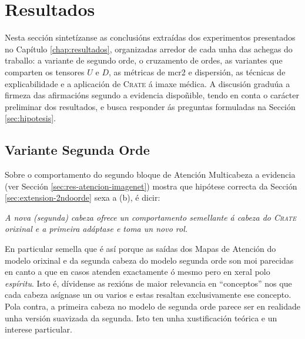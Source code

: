 \section{Resultados}

Nesta sección sintetízanse as conclusións extraídas dos experimentos presentados no Capítulo \ref{chap:resultados}, organizadas arredor de cada unha das achegas do traballo: a variante de segundo orde, o cruzamento de ordes, as variantes que comparten os tensores $U$ e $D$, as métricas de \acrshort{mcr2} e dispersión, as técnicas de explicabilidade e a aplicación de \textsc{Crate} á imaxe médica. A discusión graduúa a firmeza das afirmacións segundo a evidencia dispoñible, tendo en conta o carácter preliminar dos resultados, e busca responder ás preguntas formuladas na Sección \ref{sec:hipotesis}.


\subsection{Variante Segunda Orde}
\label{sec:con-at2nd}

Sobre o comportamento do segundo bloque de Atención Multicabeza a evidencia (ver Sección \ref{sec:res-atencion-imagenet}) mostra que hipótese correcta da Sección \ref{sec:extension-2ndoorde} sexa a (b), é dicir:

\begin{center}\begin{minipage}{0.8\textwidth}\centering \emph{A nova (segunda) cabeza ofrece un comportamento semellante á cabeza do \textsc{Crate} orixinal e a primeira adáptase e toma un novo rol.}\end{minipage}\end{center}

En particular semella que é así porque as saídas dos Mapas de Atención do modelo orixinal e da segunda cabeza do modelo segunda orde son moi parecidas en canto a que en casos atenden exactamente ó mesmo pero en xeral polo \emph{espíritu}. Isto é, dívidense as rexións de maior relevancia en ``conceptos'' nos que cada cabeza asígnase un ou varios e estas resaltan exclusivamente ese concepto. Pola contra, a primeira cabeza no modelo de segunda orde parece ser en realidade unha versión suavizada da segunda. Isto ten unha xustificación teórica e un interese particular.


